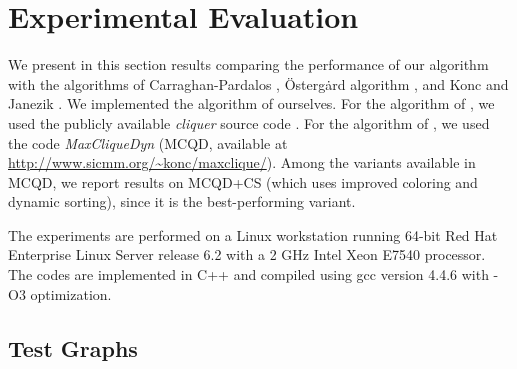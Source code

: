 \section{Experimental Evaluation}
\label{sec:experiments}

We present in this section results comparing the performance of our algorithm
with the algorithms of Carraghan-Pardalos \cite{pardalos}, 
\"{O}sterg\.{a}rd algorithm \cite{ostergard}, and
Konc and Janezik \cite{konc2007improved}. We implemented the algorithm of \cite{pardalos} ourselves. 
For the algorithm of \cite{ostergard},  we used the publicly available {\it cliquer} source code \cite{cliquer}.
For the algorithm of \cite{konc2007improved}, we used the code {\it MaxCliqueDyn} 
(MCQD, available at {\small \url{http://www.sicmm.org/~konc/maxclique/}}). 
Among the variants available in MCQD, we report results on 
MCQD+CS (which uses improved coloring and dynamic sorting),
since it is the best-performing variant.  

The experiments are performed on a Linux workstation running 64-bit Red Hat Enterprise Linux Server release 6.2 with a 2 GHz Intel Xeon E7540 processor. The codes are implemented in C++ and compiled using gcc version 4.4.6 with -O3 optimization.


\subsection{Test Graphs}

